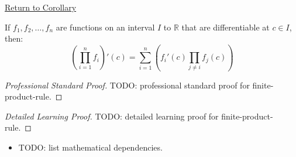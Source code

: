 \newpage
{}
\label{prf:finite-product-rule}

\begin{remark*}[Return]
\hyperref[cor:extended-product-rule]{Return to Corollary}
\end{remark*}

\begin{corollary*}
If $f_1, f_2, \ldots, f_n$ are functions on an interval $I$ to $\mathbb{R}$ that are differentiable at $c \in I$, then:
\[ \left( \prod_{i=1}^{n} f_i \right)'(c) = \sum_{i=1}^{n} \left( f_i'(c) \prod_{j \neq i} f_j(c) \right) \]
\end{corollary*}

\begin{proof}[Professional Standard Proof]
\LRAProofBodyStart
TODO: professional standard proof for finite-product-rule.
\end{proof}

\begin{proof}[Detailed Learning Proof]
\LRAProofBodyStart
TODO: detailed learning proof for finite-product-rule.
\end{proof}

\begin{remark*}
\end{remark*}

\begin{dependencies}
\begin{itemize}
  \item TODO: list mathematical dependencies.
\end{itemize}
\end{dependencies}

\clearpage
